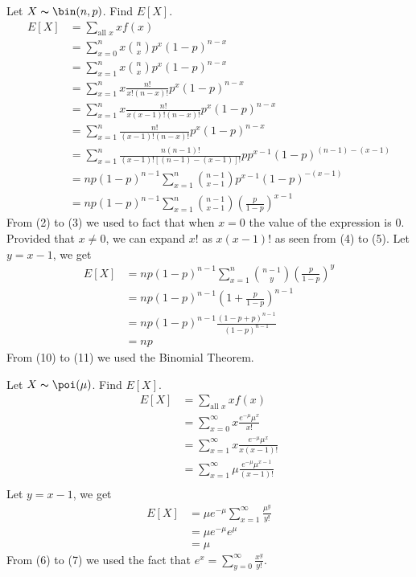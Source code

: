 Let $ X \thicksim \bin(n,p) $. Find $ E[X] $.
\setcounter{equation}{0}
\begin{align}
    E[X]&=\sum\limits_{\text{all } x}x f(x)\\
    &=\sum\limits_{x=0}^{n}x \binom{n}{x}p^x(1-p)^{n-x}\\
    &=\sum\limits_{x=1}^{n}x \binom{n}{x}p^x(1-p)^{n-x}\\
    &=\sum\limits_{x=1}^{n}x \frac{n!}{x!(n-x)!}p^x(1-p)^{n-x}\\
    &=\sum\limits_{x=1}^{n}x \frac{n!}{x(x-1)!(n-x)!}p^x(1-p)^{n-x}\\
    &=\sum\limits_{x=1}^{n}\frac{n!}{(x-1)!(n-x)!}p^x(1-p)^{n-x}\\
    &=\sum\limits_{x=1}^{n}\frac{n(n-1)!}{(x-1)![(n-1)-(x-1)]!}pp^{x-1}(1-p)^{(n-1)-(x-1)}\\
    &=np(1-p)^{n-1}\sum\limits_{x=1}^{n}\binom{n-1}{x-1}p^{x-1}(1-p)^{-(x-1)}\\
    &=np(1-p)^{n-1}\sum\limits_{x=1}^{n}\binom{n-1}{x-1}\left(\frac{p}{1-p}\right)^{x-1}
\end{align}
From (2) to (3) we used to fact that when $ x=0 $ the value of the expression 
is $ 0 $. Provided that $ x\neq 0 $, we can expand $ x! $ as $ x(x-1)! $ as
seen from (4) to (5). Let $ y=x-1 $, we get
\begin{align}
    E[X]&=np(1-p)^{n-1}\sum\limits_{x=1}^{n}\binom{n-1}{y}\left(\frac{p}{1-p}\right)^{y}\\
    &=np(1-p)^{n-1}\left(1+\frac{p}{1-p}\right)^{n-1}\\
    &=np(1-p)^{n-1}\frac{(1-p+p)^{n-1}}{(1-p)^{n-1}}\\
    &=np
\end{align}
From (10) to (11) we used the Binomial Theorem.

Let $ X \thicksim \poi(\mu) $. Find $ E[X] $.
\setcounter{equation}{0}
\begin{align}
    E[X]&=\sum\limits_{\text{all } x}x f(x)\\
    &=\sum\limits_{x=0}^{\infty} x \frac{e^{-\mu}\mu^x}{x!}\\
    &=\sum\limits_{x=1}^{\infty} x \frac{e^{-\mu}\mu^x}{x(x-1)!}\\
    &=\sum\limits_{x=1}^{\infty} \mu \frac{e^{-\mu}\mu^{x-1}}{(x-1)!}\\
\end{align}
Let $ y=x-1 $, we get
\begin{align}
    E[X]&=\mu e^{-\mu}\sum\limits_{x=1}^{\infty} \frac{\mu^{y}}{y!}\\
    &=\mu e^{-\mu}e^\mu\\
    &=\mu
\end{align}
From (6) to (7) we used the fact that $ e^x=\sum\limits_{y=0}^{\infty}\frac{x^y}{y!} $.

